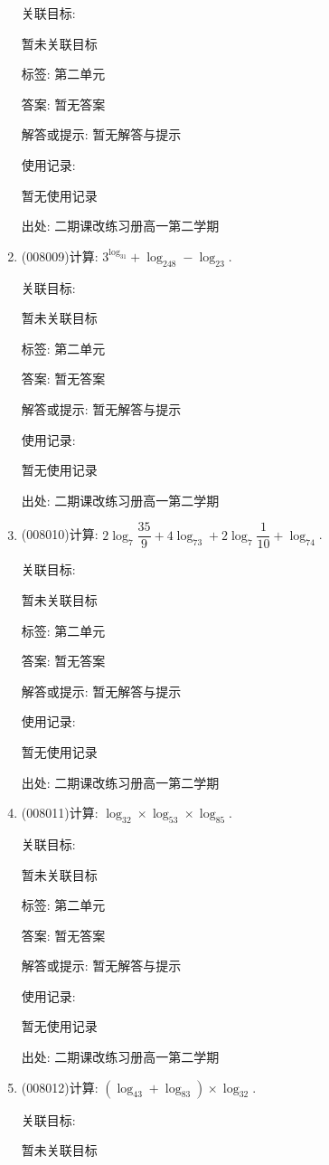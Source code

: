 \documentclass[10pt,a4paper]{article}
\begin{document}
\begin{enumerate}[1.]
关联目标:

暂未关联目标



标签: 第二单元

答案: 暂无答案

解答或提示: 暂无解答与提示

使用记录:

暂无使用记录


出处: 二期课改练习册高一第二学期
\item { (008009)}计算: $3^{\log _31}+\log _248-\log _23$.


关联目标:

暂未关联目标



标签: 第二单元

答案: 暂无答案

解答或提示: 暂无解答与提示

使用记录:

暂无使用记录


出处: 二期课改练习册高一第二学期
\item { (008010)}计算: $2\log _7\dfrac{35}9+4\log _73+2\log _7\dfrac 1{10}+\log _74$.


关联目标:

暂未关联目标



标签: 第二单元

答案: 暂无答案

解答或提示: 暂无解答与提示

使用记录:

暂无使用记录


出处: 二期课改练习册高一第二学期
\item { (008011)}计算: $\log _32\times \log _53\times \log _85$.


关联目标:

暂未关联目标



标签: 第二单元

答案: 暂无答案

解答或提示: 暂无解答与提示

使用记录:

暂无使用记录


出处: 二期课改练习册高一第二学期
\item { (008012)}计算: $(\log _43+\log _83)\times \log _32$.


关联目标:

暂未关联目标




\end{enumerate}
\end{document}
